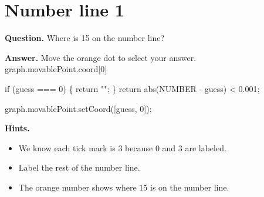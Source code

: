 \documentclass{article}
\begin{document}
\section*{Number line 1}
\textbf{Question.} Where is 15 on the number line?

\textbf{Answer.} Move the orange dot to select your answer. 
                 graph.movablePoint.coord[0] 
                
                    if (guess === 0) \{
                        return "";
                    \}
                    return abs(NUMBER - guess) < 0.001;
                
                
                    graph.movablePoint.setCoord([guess, 0]);

\textbf{Hints.}
\begin{itemize}
  \item We know each tick mark is 3 because 0 and 3 are labeled.
  \item Label the rest of the number line.
  \item The orange number shows where 15 is on the number line.
\end{itemize}
\end{document}
